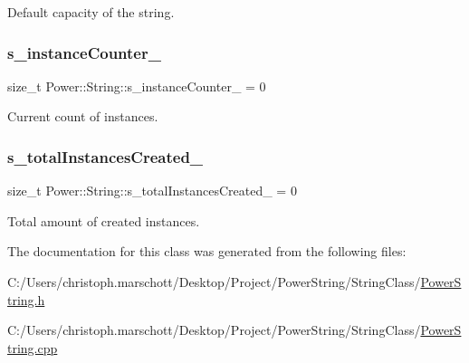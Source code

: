 Default capacity of the string. 

\mbox{\label{class_power_1_1_string_af0eb9ed7cf032a152135aae322389977}} 
\subsubsection{\texorpdfstring{s\+\_\+instance\+Counter\+\_\+}{s\_instanceCounter\_}}
{\footnotesize\ttfamily size\+\_\+t Power\+::\+String\+::s\+\_\+instance\+Counter\+\_\+ = 0\hspace{0.3cm}{\ttfamily [static]}}



Current count of instances. 

\mbox{\label{class_power_1_1_string_a629d518a942c2d23c44f509fea885cb5}} 
\subsubsection{\texorpdfstring{s\+\_\+total\+Instances\+Created\+\_\+}{s\_totalInstancesCreated\_}}
{\footnotesize\ttfamily size\+\_\+t Power\+::\+String\+::s\+\_\+total\+Instances\+Created\+\_\+ = 0\hspace{0.3cm}{\ttfamily [static]}}



Total amount of created instances. 



The documentation for this class was generated from the following files\+:\begin{DoxyCompactItemize}
\item 
C\+:/\+Users/christoph.\+marschott/\+Desktop/\+Project/\+Power\+String/\+String\+Class/\hyperlink{_power_string_8h}{Power\+String.\+h}\item 
C\+:/\+Users/christoph.\+marschott/\+Desktop/\+Project/\+Power\+String/\+String\+Class/\hyperlink{_power_string_8cpp}{Power\+String.\+cpp}\end{DoxyCompactItemize}
